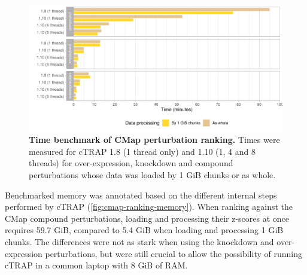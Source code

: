 \begin{figure}[!ht]
  \includegraphics[width=\textwidth]{images/ctrap/ranking-time}
  \centering
  \caption[Time benchmark of CMap perturbation ranking]{\textbf{Time benchmark of CMap perturbation ranking.} Times were measured for cTRAP 1.8 (1 thread only) and 1.10 (1, 4 and 8 threads) for over-expression, knockdown and compound perturbations whose data was loaded by 1 GiB chunks or as whole.}
  \label{fig:cmap-ranking-time}
\end{figure}

Benchmarked memory was annotated based on the different internal steps performed by cTRAP (\autoref{fig:cmap-ranking-memory}). When ranking against the CMap compound perturbations, loading and processing their z-scores at once requires 59.7 GiB, compared to 5.4 GiB when loading and processing 1 GiB chunks. The differences were not as stark when using the knockdown and over-expression perturbations, but were still crucial to allow the possibility of running cTRAP in a common laptop with 8 GiB of RAM. %

